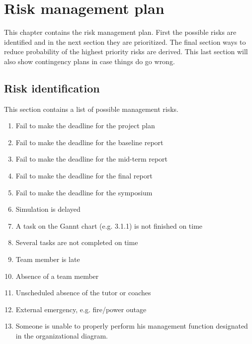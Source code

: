 \section{Risk management plan}
\label{dsePPRiskMP}
This chapter contains the risk management plan. First the possible risks are identified and in the next section they are prioritized. The final section ways to reduce probability of the highest priority risks are derived. This last section will also show contingency plans in case things do go wrong.
\subsection{Risk identification}
This section contains a list of possible management risks.
\begin{enumerate}
	\item Fail to make the deadline for the project plan
	\item Fail to make the deadline for the baseline report
	\item Fail to make the deadline for the mid-term report
	\item Fail to make the deadline for the final report
	\item Fail to make the deadline for the symposium
	\item Simulation is delayed
	\item A task on the Gannt chart (e.g. 3.1.1) is not finished on time
	\item Several tasks are not completed on time
	\item Team member is late
	\item Absence of a team member
	\item Unscheduled absence of the tutor or coaches
	\item External emergency, e.g. fire/power outage
	\item Someone is unable to properly perform his management function 		  						designated in the organizational diagram.
\end{enumerate}
